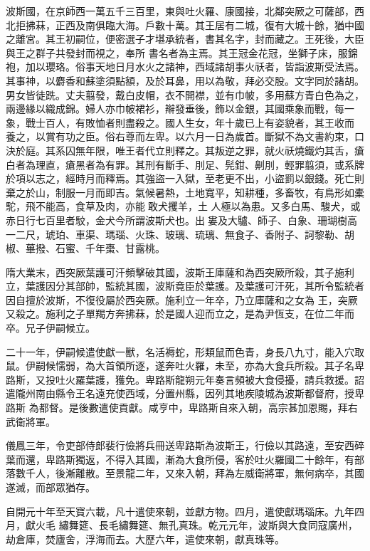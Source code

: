 \begin{pinyinscope}
 波斯國，在京師西一萬五千三百里，東與吐火羅、康國接，北鄰突厥之可薩部，西北拒拂菻，正西及南俱臨大海。戶數十萬。其王居有二城，復有大城十餘，猶中國之離宮。其王初嗣位，便密選子才堪承統者，書其名字，封而藏之。王死後，大臣與王之群子共發封而視之，奉所
 書名者為主焉。其王冠金花冠，坐獅子床，服錦袍，加以瓔珞。俗事天地日月水火之諸神，西域諸胡事火祅者，皆詣波斯受法焉。其事神，以麝香和蘇塗須點額，及於耳鼻，用以為敬，拜必交股。文字同於諸胡。男女皆徒跣。丈夫翦發，戴白皮帽，衣不開襟，並有巾帔，多用蘇方青白色為之，兩邊緣以織成錦。婦人亦巾帔裙衫，辮發垂後，飾以金銀，其國乘象而戰，每一象，戰士百人，有敗恤者則盡殺之。國人生女，年十歲已上有姿貌者，其王收而
 養之，以賞有功之臣。俗右尊而左卑。以六月一日為歲首。斷獄不為文書約束，口決於庭。其系囚無年限，唯王者代立則釋之。其叛逆之罪，就火祅燒鐵灼其舌，瘡白者為理直，瘡黑者為有罪。其刑有斷手、刖足、髡鉗、劓刖，輕罪翦須，或系牌於項以志之，經時月而釋焉。其強盜一入獄，至老更不出，小盜罰以銀錢。死亡則棄之於山，制服一月而即吉。氣候暑熱，土地寬平，知耕種，多畜牧，有鳥形如橐駝，飛不能高，食草及肉，亦能敢犬攫羊，土
 人極以為患。又多白馬、駿犬，或赤日行七百里者駮，金犬今所謂波斯犬也。出婁及大驢、師子、白象、珊瑚樹高一二尺，琥珀、車渠、瑪瑙、火珠、玻璃、琉璃、無食子、香附子、訶黎勒、胡椒、蓽撥、石蜜、千年棗、甘露桃。



 隋大業末，西突厥葉護可汗頻擊破其國，波斯王庫薩和為西突厥所殺，其子施利立，葉護因分其部帥，監統其國，波斯竟臣於葉護。及葉護可汗死，其所令監統者因自擅於波斯，不復役屬於西突厥。施利立一年卒，乃立庫薩和之女為
 王，突厥又殺之。施利之子單羯方奔拂菻，於是國人迎而立之，是為尹恆支，在位二年而卒。兄子伊嗣候立。



 二十一年，伊嗣候遣使獻一獸，名活褥蛇，形類鼠而色青，身長八九寸，能入穴取鼠。伊嗣候懦弱，為大首領所逐，遂奔吐火羅，未至，亦為大食兵所殺。其子名卑路斯，又投吐火羅葉護，獲免。卑路斯龍朔元年奏言頻被大食侵擾，請兵救援。詔遣隴州南由縣令王名遠充使西域，分置州縣，因列其地疾陵城為波斯都督府，授卑路斯
 為都督。是後數遣使貢獻。咸亨中，卑路斯自來入朝，高宗甚加恩賜，拜右武衛將軍。



 儀鳳三年，令吏部侍郎裴行儉將兵冊送卑路斯為波斯王，行儉以其路遠，至安西碎葉而還，卑路斯獨返，不得入其國，漸為大食所侵，客於吐火羅國二十餘年，有部落數千人，後漸離散。至景龍二年，又來入朝，拜為左威衛將軍，無何病卒，其國遂滅，而部眾猶存。



 自開元十年至天寶六載，凡十遣使來朝，並獻方物。四月，遣使獻瑪瑙床。九年四月，獻火毛
 繡舞筵、長毛繡舞筵、無孔真珠。乾元元年，波斯與大食同寇廣州，劫倉庫，焚廬舍，浮海而去。大歷六年，遣使來朝，獻真珠等。




\end{pinyinscope}
